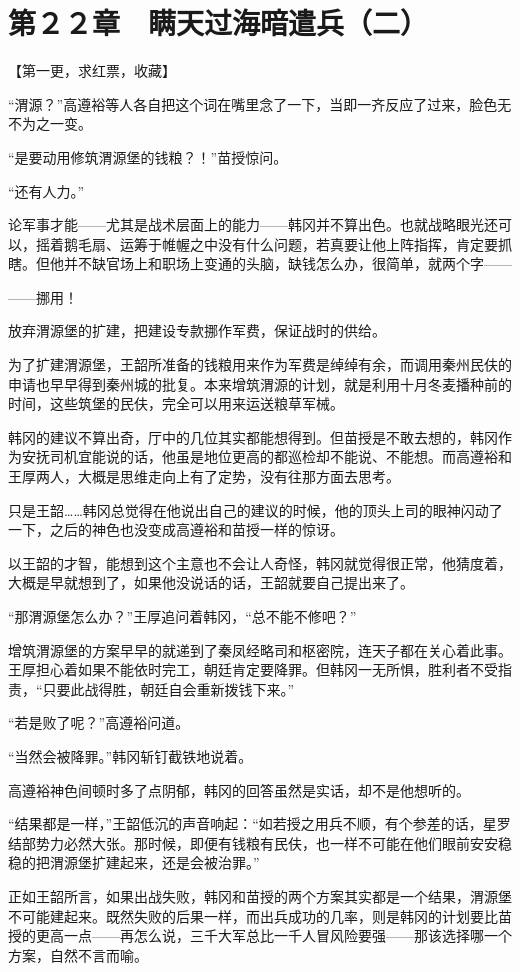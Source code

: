 \section{第２２章　瞒天过海暗遣兵（二）}

【第一更，求红票，收藏】

“渭源？”高遵裕等人各自把这个词在嘴里念了一下，当即一齐反应了过来，脸色无不为之一变。

“是要动用修筑渭源堡的钱粮？！”苗授惊问。

“还有人力。”

论军事才能——尤其是战术层面上的能力——韩冈并不算出色。也就战略眼光还可以，摇着鹅毛扇、运筹于帷幄之中没有什么问题，若真要让他上阵指挥，肯定要抓瞎。但他并不缺官场上和职场上变通的头脑，缺钱怎么办，很简单，就两个字——

——挪用！

放弃渭源堡的扩建，把建设专款挪作军费，保证战时的供给。

为了扩建渭源堡，王韶所准备的钱粮用来作为军费是绰绰有余，而调用秦州民伕的申请也早早得到秦州城的批复。本来增筑渭源的计划，就是利用十月冬麦播种前的时间，这些筑堡的民伕，完全可以用来运送粮草军械。

韩冈的建议不算出奇，厅中的几位其实都能想得到。但苗授是不敢去想的，韩冈作为安抚司机宜能说的话，他虽是地位更高的都巡检却不能说、不能想。而高遵裕和王厚两人，大概是思维走向上有了定势，没有往那方面去思考。

只是王韶……韩冈总觉得在他说出自己的建议的时候，他的顶头上司的眼神闪动了一下，之后的神色也没变成高遵裕和苗授一样的惊讶。

以王韶的才智，能想到这个主意也不会让人奇怪，韩冈就觉得很正常，他猜度着，大概是早就想到了，如果他没说话的话，王韶就要自己提出来了。

“那渭源堡怎么办？”王厚追问着韩冈，“总不能不修吧？”

增筑渭源堡的方案早早的就递到了秦凤经略司和枢密院，连天子都在关心着此事。王厚担心着如果不能依时完工，朝廷肯定要降罪。但韩冈一无所惧，胜利者不受指责，“只要此战得胜，朝廷自会重新拨钱下来。”

“若是败了呢？”高遵裕问道。

“当然会被降罪。”韩冈斩钉截铁地说着。

高遵裕神色间顿时多了点阴郁，韩冈的回答虽然是实话，却不是他想听的。

“结果都是一样，”王韶低沉的声音响起：“如若授之用兵不顺，有个参差的话，星罗结部势力必然大张。那时候，即便有钱粮有民伕，也一样不可能在他们眼前安安稳稳的把渭源堡扩建起来，还是会被治罪。”

正如王韶所言，如果出战失败，韩冈和苗授的两个方案其实都是一个结果，渭源堡不可能建起来。既然失败的后果一样，而出兵成功的几率，则是韩冈的计划要比苗授的更高一点——再怎么说，三千大军总比一千人冒风险要强——那该选择哪一个方案，自然不言而喻。


